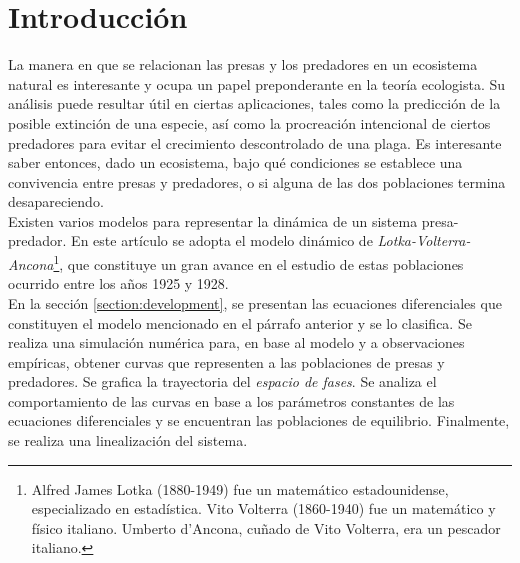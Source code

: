 \documentclass[journal, monochrome]{IEEEtran}
\begin{document}
%
\IEEEpeerreviewmaketitle
\vspace{0.5cm}

\section{Introducción}

La manera en que se relacionan las presas y los predadores en un ecosistema natural
es interesante y ocupa un papel preponderante en la teoría ecologista. Su
análisis puede resultar útil en ciertas aplicaciones, tales como la predicción
de la posible extinción de una especie, así como la procreación intencional de
ciertos predadores para evitar el crecimiento descontrolado de una plaga. Es interesante saber entonces, dado un ecosistema, bajo qué condiciones
se establece una convivencia entre presas y predadores, o si alguna de las
dos poblaciones termina desapareciendo.\\

Existen varios modelos para representar la dinámica de un sistema presa-predador.
En este artículo se adopta el modelo dinámico de \textit{Lotka-Volterra-Ancona}\footnote{Alfred James Lotka (1880-1949) fue un matemático estadounidense, especializado en estadística. 
Vito Volterra (1860-1940) fue un matemático y físico italiano. Umberto d’Ancona, cuñado de Vito Volterra, era un pescador italiano.},
que constituye un gran avance en el estudio de estas poblaciones ocurrido entre los años
1925 y 1928.\\

En la sección \ref{section:development}, se presentan las ecuaciones diferenciales
que constituyen el modelo mencionado en el párrafo anterior y se lo clasifica. Se realiza una simulación numérica para, en base al modelo y a observaciones empíricas, obtener curvas que 
representen a las poblaciones de presas y predadores. Se grafica la trayectoria del \textit{espacio de fases}. Se analiza el comportamiento de las curvas en base a los parámetros constantes 
de las ecuaciones diferenciales y se encuentran las poblaciones de equilibrio. Finalmente, se realiza una linealización del sistema.\\
\end{document}
